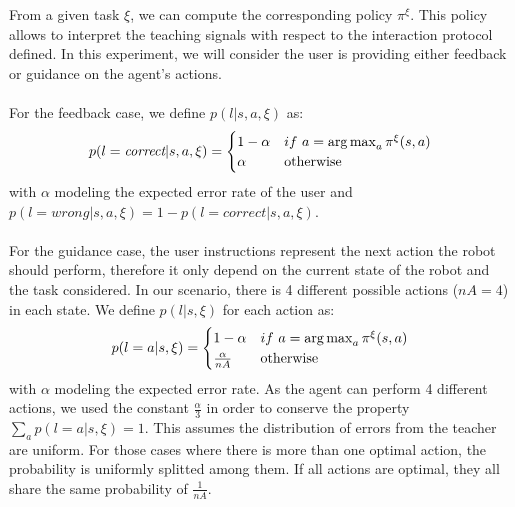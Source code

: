 From a given task $\xi$, we can compute the corresponding policy $\pi^{\xi}$. This policy allows to interpret the teaching signals with respect to the interaction protocol defined. In this experiment, we will consider the user is providing either feedback or guidance on the agent's actions. 

\paragraph{} For the feedback case, we define $p(l |s,a,\xi)$ as:
%
\begin{equation}
    p(l = \emph{correct} |s,a,\xi) = 
    \begin{cases}
    1-\alpha               & if~a = \argmax_a \pi^{\xi}(s,a)\\
        \alpha             & \text{otherwise}\\
   \end{cases}
\end{equation}
%
with $\alpha$ modeling the expected error rate of the user and $p(l = wrong |s,a,\xi) = 1 - p(l = correct |s,a,\xi)$.

\paragraph{} For the guidance case, the user instructions represent the next action the robot should perform, therefore it only depend on the current state of the robot and the task considered. In our scenario, there is 4 different possible actions ($nA = 4$) in each state. We define $p(l |s, \xi)$ for each action as:
%
\begin{equation}
    p(l = a |s,\xi) = 
    \begin{cases}
        1-\alpha & if~a = \argmax_a \pi^{\xi}(s,a)\\
        \frac{\alpha}{nA} & \text{otherwise}\\
   \end{cases}
\end{equation}
%
with $\alpha$ modeling the expected error rate. As the agent can perform 4 different actions, we used the constant $\frac{\alpha}{3}$ in order to conserve the property $\sum_a p(l = a |s,\xi) = 1$. This assumes the distribution of errors from the teacher are uniform. For those cases where there is more than one optimal action, the probability is uniformly splitted among them. If all actions are optimal, they all share the same probability of $\frac{1}{nA}$.

